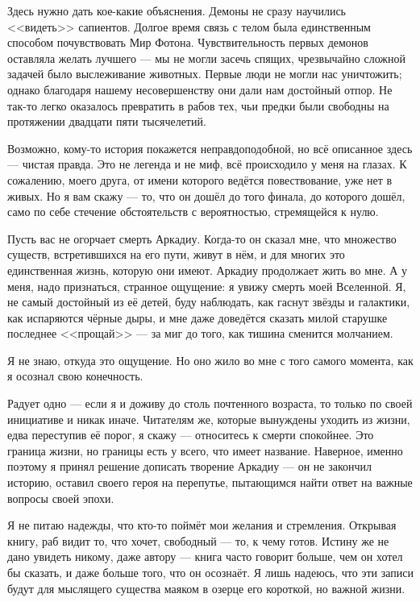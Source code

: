 \textspace

Здесь нужно дать кое-какие объяснения.
Демоны не сразу научились <<видеть>> сапиентов.
Долгое время связь с телом была единственным способом почувствовать Мир Фотона.
Чувствительность первых демонов оставляла желать лучшего --- мы не могли засечь спящих, чрезвычайно сложной задачей было выслеживание животных.
Первые люди не могли нас уничтожить;
однако благодаря нашему несовершенству они дали нам достойный отпор.
Не так-то легко оказалось превратить в рабов тех, чьи предки были свободны на протяжении двадцати пяти тысячелетий.

\textspace

Возможно, кому-то история покажется неправдоподобной, но всё описанное здесь --- чистая правда.
Это не легенда и не миф, всё происходило у меня на глазах.
К сожалению, моего друга, от имени которого ведётся повествование, уже нет в живых.
Но я вам скажу --- то, что он дошёл до того финала, до которого дошёл, само по себе стечение обстоятельств с вероятностью, стремящейся к нулю.

Пусть вас не огорчает смерть Аркадиу.
Когда-то он сказал мне, что множество существ, встретившихся на его пути, живут в нём, и для многих это единственная жизнь, которую они имеют.
Аркадиу продолжает жить во мне.
А у меня, надо признаться, странное ощущение: я увижу смерть моей Вселенной.
Я, не самый достойный из её детей, буду наблюдать, как гаснут звёзды и галактики, как испаряются чёрные дыры, и мне даже доведётся сказать милой старушке последнее <<прощай>> --- за миг до того, как тишина сменится молчанием.

Я не знаю, откуда это ощущение.
Но оно жило во мне с того самого момента, как я осознал свою конечность.

Радует одно --- если я и доживу до столь почтенного возраста, то только по своей инициативе и никак иначе.
Читателям же, которые вынуждены уходить из жизни, едва переступив её порог, я скажу --- относитесь к смерти спокойнее.
Это граница жизни, но границы есть у всего, что имеет название.
Наверное, именно поэтому я принял решение дописать творение Аркадиу --- он не закончил историю, оставил своего героя на перепутье, пытающимся найти ответ на важные вопросы своей эпохи.

Я не питаю надежды, что кто-то поймёт мои желания и стремления.
Открывая книгу, раб видит то, что хочет, свободный --- то, к чему готов.
Истину же не дано увидеть никому, даже автору --- книга часто говорит больше, чем он хотел бы сказать, и даже больше того, что он осознаёт.
Я лишь надеюсь, что эти записи будут для мыслящего существа маяком в озерце его короткой, но важной жизни.

